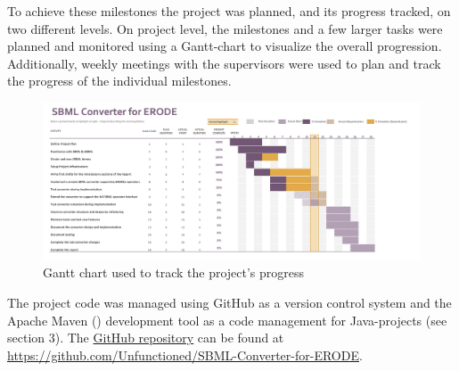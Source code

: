 To achieve these milestones the project was planned, and its progress tracked, on two different levels. On project level, the milestones and a few larger tasks were  planned and monitored using a Gantt-chart to visualize the overall progression. Additionally, weekly meetings with the supervisors were used to plan and track the progress of the individual milestones.
\begin{figure}[H]
    \centering
    \includegraphics[scale=0.38]{Sections/Images/Project Plan.jpg}
    \caption{Gantt chart used to track the project's progress}
    \label{fig:gantt}
\end{figure}
The project code was managed using GitHub as a version control system and the Apache Maven (\cite{porter_zyl_lamy}) development tool as a code management for Java-projects (see section 3).
The \href{https://github.com/Unfunctioned/SBML-Converter-for-ERODE}{GitHub repository} can be found at \url{https://github.com/Unfunctioned/SBML-Converter-for-ERODE}.



